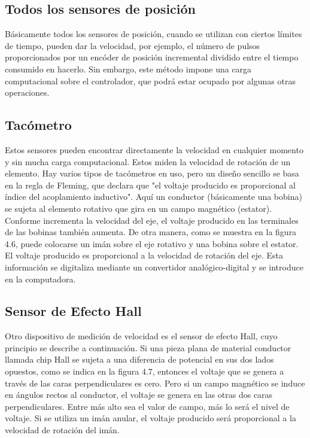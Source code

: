 \subsection*{\quad\textbf{Todos los sensores de posición}}
Básicamente todos los sensores de posición, cuando se utilizan con ciertos límites de tiempo, pueden dar la velocidad, por ejemplo, el número de pulsos proporcionados por un encóder de posición incremental dividido entre el tiempo consumido en hacerlo. Sin embargo, este método impone una carga computacional sobre el controlador, que podrá estar ocupado por algunas otras operaciones.


\subsection*{\quad\textbf{Tacómetro}}
Estos sensores pueden encontrar directamente la velocidad en cualquier momento y sin mucha carga computacional. Estos miden la velocidad de rotación de un elemento. Hay varios tipos de tacómetros en uso, pero un diseño sencillo se basa en la regla de Fleming, que declara que "el voltaje producido es proporcional al índice del acoplamiento inductivo". Aquí un conductor (básicamente una bobina) se sujeta al elemento rotativo que gira en un campo magnético (estator). Conforme incrementa la velocidad del eje, el voltaje producido en las terminales de las bobinas también aumenta. De otra manera, como se muestra en la figura 4.6, puede colocarse un imán sobre el eje rotativo y una bobina sobre el estator. El voltaje producido es proporcional a la velocidad de rotación del eje. Esta información se digitaliza mediante un convertidor analógico-digital y se introduce en la computadora.

\subsection*{\quad\textbf{Sensor de Efecto Hall}}
Otro dispositivo de medición de velocidad es el sensor de efecto Hall, cuyo principio se describe a continuación. Si una pieza plana de material conductor llamada chip Hall se sujeta a una diferencia de potencial en sus dos lados opuestos, como se indica en la figura 4.7, entonces el voltaje que se genera a través de las caras perpendiculares es cero. Pero si un campo magnético se induce en ángulos rectos al conductor, el voltaje se genera en las otras dos caras perpendiculares. Entre más alto sea el valor de campo, más lo será el nivel de voltaje. Si se utiliza un imán anular, el voltaje producido será proporcional a la velocidad de rotación del imán.


